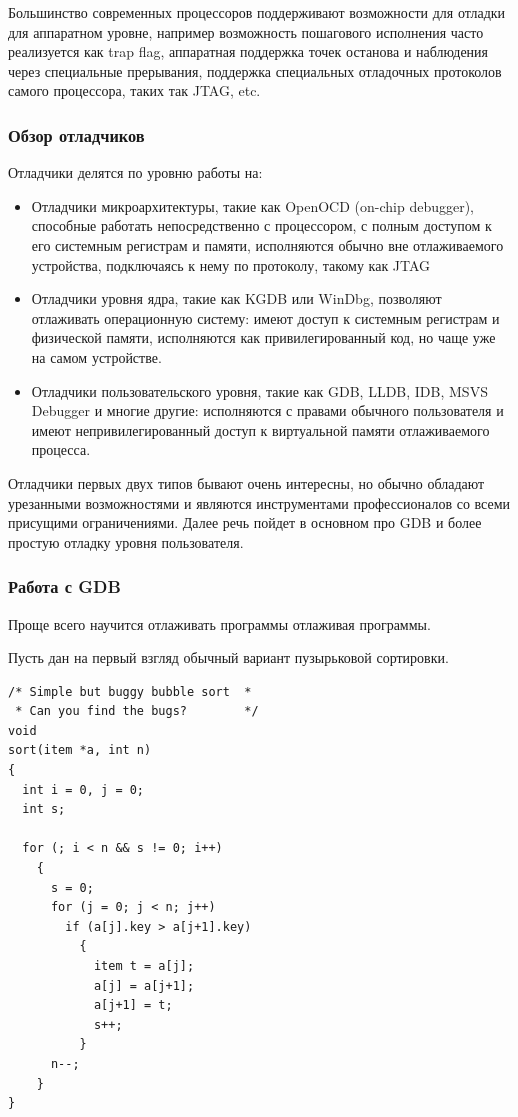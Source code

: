\documentclass[a4paper,12pt,oneside]{article}
\begin{document}
Большинство современных процессоров поддерживают возможности для отладки для аппаратном уровне, например возможность пошагового исполнения часто реализуется как trap flag, аппаратная поддержка точек останова и наблюдения через специальные прерывания, поддержка специальных отладочных протоколов самого процессора, таких так JTAG, etc.

\subsubsection{Обзор отладчиков}\label{subsubsec:Overview}

Отладчики делятся по уровню работы на:

\begin{itemize}
\item Отладчики микроархитектуры, такие как OpenOCD (on-chip debugger), способные работать непосредственно с процессором, с полным доступом к его системным регистрам и памяти, исполняются обычно вне отлаживаемого устройства, подключаясь к нему по протоколу, такому как JTAG

\item Отладчики уровня ядра, такие как KGDB или WinDbg, позволяют отлаживать операционную систему: имеют доступ к системным регистрам и физической памяти, исполняются как привилегированный код, но чаще уже на самом устройстве.

\item Отладчики пользовательского уровня, такие как GDB, LLDB, IDB, MSVS Debugger и многие другие: исполняются с правами обычного пользователя и имеют непривилегированный доступ к виртуальной памяти отлаживаемого процесса.
\end{itemize}

Отладчики первых двух типов бывают очень интересны, но обычно обладают урезанными возможностями и являются инструментами профессионалов со всеми присущими ограничениями. Далее речь пойдет в основном про GDB и более простую отладку уровня пользователя.

\subsubsection{Работа с GDB}\label{subsubsec:GDB}

Проще всего научится отлаживать программы отлаживая программы. 

Пусть дан на первый взгляд обычный вариант пузырьковой сортировки.

\begin{lstlisting}
/* Simple but buggy bubble sort  *
 * Can you find the bugs?        */
void 
sort(item *a, int n) 
{ 
  int i = 0, j = 0;
  int s;

  for (; i < n && s != 0; i++) 
    {
      s = 0;
      for (j = 0; j < n; j++) 
        if (a[j].key > a[j+1].key)   
          {
            item t = a[j];
            a[j] = a[j+1];
            a[j+1] = t;
            s++;
          }
      n--;
    }
}
\end{lstlisting}
\end{document}
